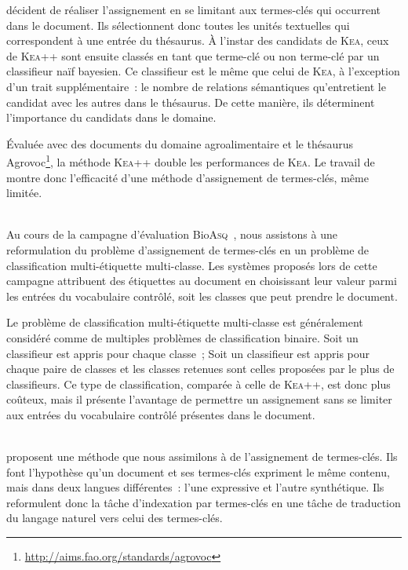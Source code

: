      décident de réaliser l'assignement en se
    limitant aux termes-clés qui occurrent dans le document. Ils sélectionnent
    donc toutes les unités textuelles qui correspondent à une entrée du
    thésaurus. À l'instar des candidats de \textsc{Kea}, ceux de \textsc{Kea++}
    sont ensuite classés en tant que \og{}terme-clé\fg{} ou \og{}non
    terme-clé\fg{} par un classifieur naïf bayesien. Ce classifieur est le même
    que celui de \textsc{Kea}, à l'exception d'un trait supplémentaire~: le
    nombre de relations sémantiques qu'entretient le candidat avec les autres
    dans le thésaurus. De cette manière, ils déterminent l'importance du
    candidats dans le domaine.

    Évaluée avec des documents du domaine agroalimentaire et le thésaurus
    Agrovoc\footnote{\url{http://aims.fao.org/standards/agrovoc}},
    la méthode \textsc{Kea}++ double les performances de \textsc{Kea}. Le travail de
     montre donc l'efficacité d'une méthode
    d'assignement de termes-clés, même limitée.

    ~\\Au cours de la campagne d'évaluation
    Bio\textsc{Asq}~\cite{partalas2013bioasq}, nous assistons à une
    reformulation du problème d'assignement de termes-clés en un problème de
    classification multi-étiquette multi-classe. Les systèmes proposés lors de
    cette campagne attribuent des étiquettes au document en choisissant leur
    valeur parmi les entrées du vocabulaire contrôlé, soit les classes que peut
    prendre le document.

    Le problème de classification multi-étiquette multi-classe est généralement
    considéré comme de multiples problèmes de classification binaire. Soit un
    classifieur est appris pour chaque classe~; Soit un classifieur est appris
    pour chaque paire de classes et les classes retenues sont celles proposées
    par le plus de classifieurs. Ce type de classification, comparée à celle de
    \textsc{Kea}++, est donc plus coûteux, mais il présente l'avantage de
    permettre un assignement sans se limiter aux entrées du vocabulaire contrôlé
    présentes dans le document.

    ~\\ proposent une méthode que nous assimilons
    à de l'assignement de termes-clés. Ils font l'hypothèse qu'un document et
    ses termes-clés expriment le même contenu, mais dans deux langues
    différentes~: l'une expressive et l'autre synthétique. Ils reformulent donc
    la tâche d'indexation par termes-clés en une tâche de traduction du langage
    naturel vers celui des termes-clés.
    
